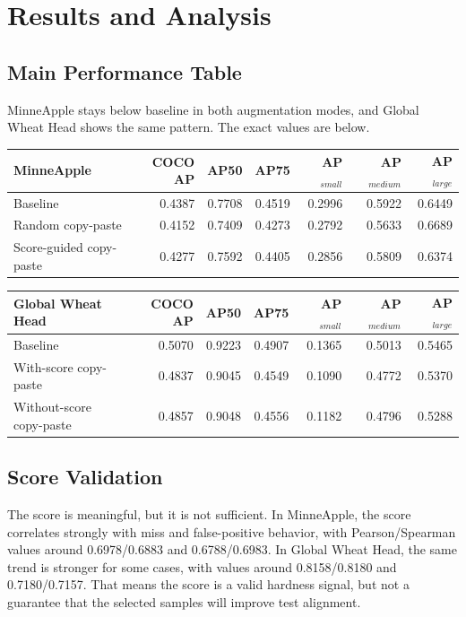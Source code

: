 \section{Results and Analysis}

\subsection{Main Performance Table}
MinneApple stays below baseline in both augmentation modes, and Global Wheat Head shows the same pattern. The exact values are below.

\begin{center}
\small
\begin{tabular}{@{}lrrrrrr@{}}
\toprule
\textbf{MinneApple} & \textbf{COCO AP} & \textbf{AP50} & \textbf{AP75} & \textbf{AP$_{small}$} & \textbf{AP$_{medium}$} & \textbf{AP$_{large}$} \\
\midrule
Baseline & 0.4387 & 0.7708 & 0.4519 & 0.2996 & 0.5922 & 0.6449 \\
Random copy-paste & 0.4152 & 0.7409 & 0.4273 & 0.2792 & 0.5633 & 0.6689 \\
Score-guided copy-paste & 0.4277 & 0.7592 & 0.4405 & 0.2856 & 0.5809 & 0.6374 \\
\bottomrule
\end{tabular}
\end{center}

\begin{center}
\small
\begin{tabular}{@{}lrrrrrr@{}}
\toprule
\textbf{Global Wheat Head} & \textbf{COCO AP} & \textbf{AP50} & \textbf{AP75} & \textbf{AP$_{small}$} & \textbf{AP$_{medium}$} & \textbf{AP$_{large}$} \\
\midrule
Baseline & 0.5070 & 0.9223 & 0.4907 & 0.1365 & 0.5013 & 0.5465 \\
With-score copy-paste & 0.4837 & 0.9045 & 0.4549 & 0.1090 & 0.4772 & 0.5370 \\
Without-score copy-paste & 0.4857 & 0.9048 & 0.4556 & 0.1182 & 0.4796 & 0.5288 \\
\bottomrule
\end{tabular}
\end{center}

\subsection{Score Validation}
The score is meaningful, but it is not sufficient. In MinneApple, the score correlates strongly with miss and false-positive behavior, with Pearson/Spearman values around 0.6978/0.6883 and 0.6788/0.6983. In Global Wheat Head, the same trend is stronger for some cases, with values around 0.8158/0.8180 and 0.7180/0.7157. That means the score is a valid hardness signal, but not a guarantee that the selected samples will improve test alignment.

